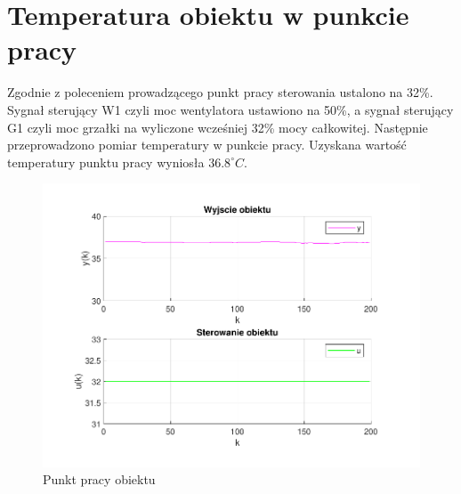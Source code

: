 \section{Temperatura obiektu w punkcie pracy}

Zgodnie z poleceniem prowadzącego punkt pracy sterowania ustalono na \num{32}\%.
Sygnał sterujący W1 czyli moc wentylatora ustawiono na \num{50}\%, 
a sygnał sterujący G1 czyli moc grzałki na wyliczone wcześniej \num{32}\% mocy całkowitej.
Następnie przeprowadzono pomiar temperatury w punkcie pracy. 
Uzyskana wartość temperatury punktu pracy wyniosła $\num{36.8}^{\circ} C$.

\begin{figure}[H]
    \centering
    \includegraphics[scale=0.90]{../lab/zad_1/y.pdf}
    \caption{Punkt pracy obiektu}
\end{figure}

